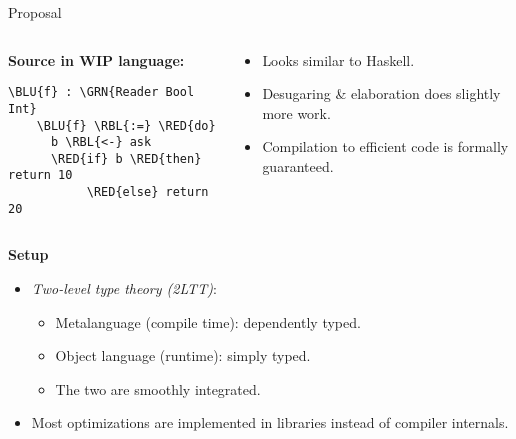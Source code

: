\documentclass[dvipsnames,aspectratio=169]{beamer}
\theoremstyle{remark}
\newcommand{\RED}[1]{{\color{BrickRed} #1}}
\newcommand{\GRN}[1]{{\color{OliveGreen} #1}}
\newcommand{\RBL}[1]{{\color{RoyalBlue} #1}}
\newcommand{\BLU}[1]{{\color{Blue} #1}}
\begin{document}
\begin{frame}[fragile]{Proposal}

\begin{columns}
\begin{column}{0.3\textwidth}
\textbf{Source in WIP language:}
\begin{Verbatim}[commandchars=\\\{\}]
    \BLU{f} : \GRN{Reader Bool Int}
    \BLU{f} \RBL{:=} \RED{do}
      b \RBL{<-} ask
      \RED{if} b \RED{then} return 10
           \RED{else} return 20
\end{Verbatim}

\end{column}
\begin{column}{0.6\textwidth}
\begin{itemize}
\item Looks similar to Haskell.
\item Desugaring \& elaboration does slightly more work.
\item Compilation to efficient code is formally guaranteed.
\end{itemize}
\end{column}
\end{columns}
\vspace{1em}
\pause

\begin{block}{}
\textbf{Setup}
\begin{itemize}
\item \emph{Two-level type theory (2LTT)}:
  \begin{itemize}
    \item Metalanguage (compile time): dependently typed.
    \item Object language (runtime): simply typed.
    \item The two are smoothly integrated.
  \end{itemize}
\item Most optimizations are implemented in libraries instead of compiler internals.
\end{itemize}
\end{block}

\end{frame}
\end{document}
